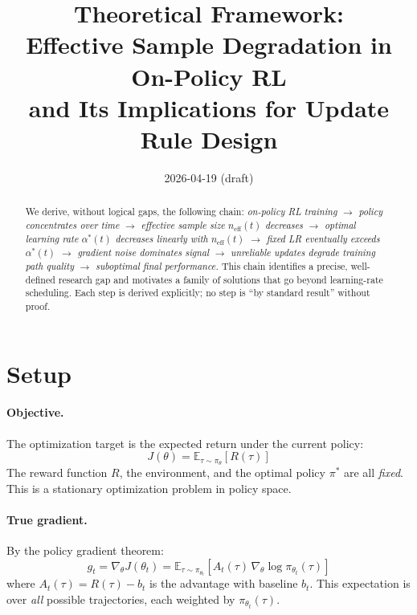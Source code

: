 \documentclass[11pt,a4paper]{article}
\title{Theoretical Framework:\\
       Effective Sample Degradation in On-Policy RL\\
       and Its Implications for Update Rule Design}
\date{2026-04-19 (draft)}
\newcommand{\E}{\mathbb{E}}
\newcommand{\neff}{n_{\mathrm{eff}}}
\newcommand{\gtrue}{g_t}
\newcommand{\pith}{\pi_{\theta_t}}
\newcommand{\alphaopt}{\alpha^*(t)}
\begin{document}
\maketitle

\begin{abstract}
We derive, without logical gaps, the following chain:
\emph{on-policy RL training $\to$ policy concentrates over time $\to$ effective sample size
$\neff(t)$ decreases $\to$ optimal learning rate $\alphaopt$ decreases linearly with $\neff(t)$
$\to$ fixed LR eventually exceeds $\alphaopt$ $\to$ gradient noise dominates signal
$\to$ unreliable updates degrade training path quality $\to$ suboptimal final performance.}
This chain identifies a precise, well-defined research gap and motivates a family of solutions
that go beyond learning-rate scheduling.
Each step is derived explicitly; no step is ``by standard result'' without proof.
\end{abstract}

\tableofcontents
\newpage

\section{Setup}

\paragraph{Objective.}
The optimization target is the expected return under the current policy:
\begin{equation}
  J(\theta) = \E_{\tau \sim \pi_\theta}[R(\tau)]
  \label{eq:objective}
\end{equation}
The reward function $R$, the environment, and the optimal policy $\pi^*$ are all \emph{fixed}.
This is a stationary optimization problem in policy space.

\paragraph{True gradient.}
By the policy gradient theorem:
\begin{equation}
  \gtrue = \nabla_\theta J(\theta_t)
           = \E_{\tau \sim \pith}\!\left[A_t(\tau)\,\nabla_\theta \log \pith(\tau)\right]
  \label{eq:true-gradient}
\end{equation}
where $A_t(\tau) = R(\tau) - b_t$ is the advantage with baseline $b_t$.
This expectation is over \emph{all} possible trajectories, each weighted by $\pith(\tau)$.
\end{document}
